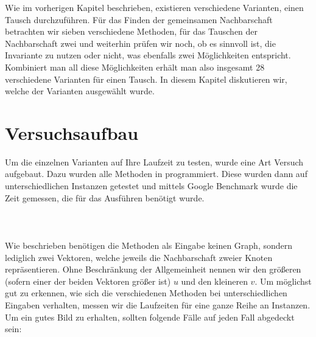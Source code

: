 
Wie im vorherigen Kapitel beschrieben, existieren verschiedene Varianten, einen \gc{} Tausch 
durchzuführen. Für das Finden der gemeinsamen Nachbarschaft betrachten wir sieben verschiedene Methoden, 
für das Tauschen der Nachbarschaft zwei und weiterhin prüfen wir noch, ob es sinnvoll ist, 
die  Invariante zu nutzen oder nicht, was ebenfalls zwei Möglichkeiten entspricht.
Kombiniert man all diese Möglichkeiten erhält man also insgesamt 28 verschiedene Varianten für einen \gc{} 
Tausch.
In diesem Kapitel diskutieren wir, welche der Varianten ausgewählt wurde.

\section{Versuchsaufbau}
Um die einzelnen Varianten auf Ihre Laufzeit zu testen, wurde eine Art Versuch aufgebaut.
Dazu wurden alle Methoden in \cpp programmiert. Diese wurden dann auf unterschiedlichen
Instanzen getestet und mittels Google Benchmark \cite{benchmark} wurde die Zeit gemessen, 
die für das Ausführen benötigt wurde.
\\
\\
\\
\\
Wie %
beschrieben benötigen die Methoden als Eingabe keinen Graph, 
sondern lediglich zwei Vektoren, welche jeweils die Nachbarschaft zweier Knoten repräsentieren. Ohne 
Beschränkung der Allgemeinheit nennen wir den größeren (sofern einer der beiden Vektoren größer ist)
$u$ und den kleineren $v$.
Um möglichst gut zu erkennen, wie sich die verschiedenen Methoden bei unterschiedlichen
Eingaben verhalten, messen wir die Laufzeiten für eine ganze Reihe an Instanzen. 
Um ein gutes Bild zu erhalten, sollten folgende Fälle auf jeden Fall abgedeckt sein:

